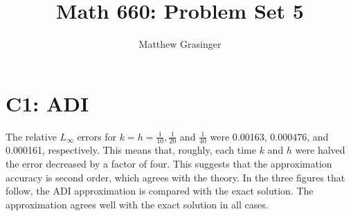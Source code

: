 \documentclass[a4paper,10pt]{article}
\title{Math 660: Problem Set 5}
\author{Matthew Grasinger}
\begin{document}
  \maketitle

	\section{C1: ADI}
	
	The relative $L_\infty$ errors for $k = h = \frac{1}{10}, \frac{1}{20}$ and $\frac{1}{40}$ were 0.00163, 0.000476, and 0.000161, respectively.
	This means that, roughly, each time $k$ and $h$ were halved the error decreased by a factor of four.
	This suggests that the approximation accuracy is second order, which agrees with the theory.
	In the three figures that follow, the ADI approximation is compared with the exact solution.
	The approximation agrees well with the exact solution in all cases.
\end{document}
